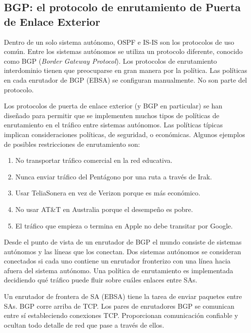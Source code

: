 \subsection{BGP: el protocolo de enrutamiento de Puerta de Enlace Exterior}
	
	\par Dentro de un solo sistema autónomo, OSPF e IS-IS son los protocolos de uso común. Entre los sistemas autónomos se utiliza un protocolo diferente, conocido como BGP (\textit{Border Gateway Protocol}). Los protocolos de enrutamiento interdominio tienen que preocuparse en gran manera por la política. Las políticas en cada enrutador de BGP (EBSA) se configuran manualmente. No son parte del protocolo.
	
	\par Los protocolos de puerta de enlace exterior (y BGP en particular) se han diseñado para permitir que se implementen muchos tipos de políticas de enrutamiento en el tráfico entre sistemas autónomos. Las políticas típicas implican consideraciones políticas, de seguridad, o económicas. Algunos ejemplos de posibles restricciones de enrutamiento son:
		\begin{enumerate}
			\item  No transportar tráfico comercial en la red educativa.
			\item Nunca enviar tráfico del Pentágono por una ruta a través de Irak.
			\item Usar TeliaSonera en vez de Verizon porque es más económico.
			\item No usar AT\&T en Australia porque el desempeño es pobre.
			\item El tráfico que empieza o termina en Apple no debe transitar por Google.
		\end{enumerate}
	
	\par Desde el punto de vista de un enrutador de BGP el mundo consiste de sistemas autónomos y las líneas que los conectan. Dos sistemas autónomos se consideran conectados si cada uno contiene un enrutador fronterizo con una línea hacia afuera del sistema autónomo. Una política de enrutamiento es implementada decidiendo qué tráfico puede fluir sobre cuáles enlaces entre SAs.

	\par Un enrutador de frontera de SA (EBSA) tiene la tarea de enviar paquetes entre SAs. BGP corre arriba de TCP. Los pares de enrutadores BGP se comunican entre sí estableciendo conexiones TCP. Proporcionan comunicación confiable y ocultan todo detalle de red que pase a través de ellos.

